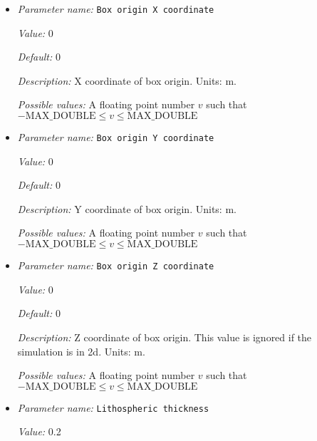 \begin{itemize}
\item {\it Parameter name:} {\tt Box origin X coordinate}
\label{parameters:Geometry model/Box with lithosphere boundary indicators/Box origin X coordinate}


{\it Value:} 0


{\it Default:} 0


{\it Description:} X coordinate of box origin. Units: m.


{\it Possible values:} A floating point number $v$ such that $-\text{MAX\_DOUBLE} \leq v \leq \text{MAX\_DOUBLE}$
\item {\it Parameter name:} {\tt Box origin Y coordinate}
\label{parameters:Geometry model/Box with lithosphere boundary indicators/Box origin Y coordinate}


{\it Value:} 0


{\it Default:} 0


{\it Description:} Y coordinate of box origin. Units: m.


{\it Possible values:} A floating point number $v$ such that $-\text{MAX\_DOUBLE} \leq v \leq \text{MAX\_DOUBLE}$
\item {\it Parameter name:} {\tt Box origin Z coordinate}
\label{parameters:Geometry model/Box with lithosphere boundary indicators/Box origin Z coordinate}


{\it Value:} 0


{\it Default:} 0


{\it Description:} Z coordinate of box origin. This value is ignored if the simulation is in 2d. Units: m.


{\it Possible values:} A floating point number $v$ such that $-\text{MAX\_DOUBLE} \leq v \leq \text{MAX\_DOUBLE}$
\item {\it Parameter name:} {\tt Lithospheric thickness}
\label{parameters:Geometry model/Box with lithosphere boundary indicators/Lithospheric thickness}


{\it Value:} 0.2



\end{itemize}
